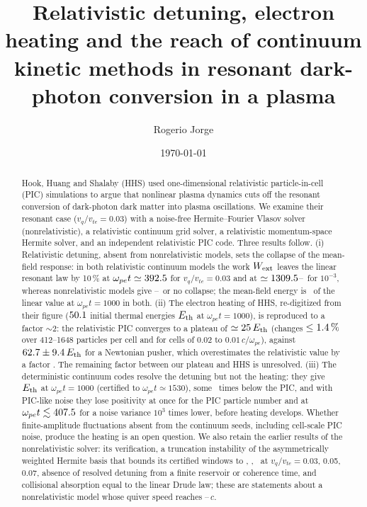 \documentclass[aps,pre,reprint,floatfix,amsmath,amssymb,nofootinbib,superscriptaddress]{revtex4-2}
\newcommand{\vq}{v_q/v_{te}}
\newcommand{\wpe}{\omega_{pe}}
\newcommand{\Wext}{W_{\rm ext}}
\begin{document}
\title{Relativistic detuning, electron heating and the reach of continuum kinetic methods in resonant dark-photon conversion in a plasma}
\author{Rogerio Jorge}
\date{\today}

\begin{abstract}
Hook, Huang and Shalaby (HHS) used one-dimensional relativistic particle-in-cell (PIC) simulations to argue that nonlinear plasma dynamics cuts off the resonant conversion of dark-photon dark matter into plasma oscillations. We examine their resonant case ($\vq=0.03$) with a noise-free Hermite--Fourier Vlasov solver (nonrelativistic), a relativistic continuum grid solver, a relativistic momentum-space Hermite solver, and an independent relativistic PIC code. Three results follow. (i) Relativistic detuning, absent from nonrelativistic models, sets the collapse of the mean-field response: in both relativistic continuum models the work $\Wext$ leaves the linear resonant law by 10\,\% at $\wpe t\simeq\herCol$ for $\vq=0.03$ and at $\simeq1309.5$--\relColWeakShot\ for $10^{-3}$, whereas nonrelativistic models give \nrColLo--\nrColHi\ or no collapse; the mean-field energy is \herFld\ of the linear value at $\wpe t=1000$ in both. (ii) The electron heating of HHS, re-digitized from their figure ($50.1$ initial thermal energies $E_{\rm th}$ at $\wpe t=1000$), is reproduced to a factor $\sim2$: the relativistic PIC converges to a plateau of $\simeq25\,E_{\rm th}$ (changes $\le1.4\,\%$ over 412--1648 particles per cell and for cells of 0.02 to $0.01\,c/\wpe$), against $62.7\pm9.4\,E_{\rm th}$ for a Newtonian pusher, which overestimates the relativistic value by a factor \pcNewtRel. The remaining factor between our plateau and HHS is unresolved. (iii) The deterministic continuum codes resolve the detuning but not the heating: they give \herHeat\,$E_{\rm th}$ at $\wpe t=1000$ (certified to $\wpe t\simeq1530$), some \pcContRatio\ times below the PIC, and with PIC-like noise they lose positivity at once for the PIC particle number and at $\wpe t\lesssim\shotFnegHi$ for a noise variance $10^3$ times lower, before heating develops. Whether finite-amplitude fluctuations absent from the continuum seeds, including cell-scale PIC noise, produce the heating is an open question. We also retain the earlier results of the nonrelativistic solver: its verification, a truncation instability of the asymmetrically weighted Hermite basis that bounds its certified windows to \winA, \winB, \winC\ at $\vq=0.03$, 0.05, 0.07, absence of resolved detuning from a finite reservoir or coherence time, and collisional absorption equal to the linear Drude law; these are statements about a nonrelativistic model whose quiver speed reaches \quivA--\quivC$\,c$.
\end{abstract}
\maketitle
\end{document}
